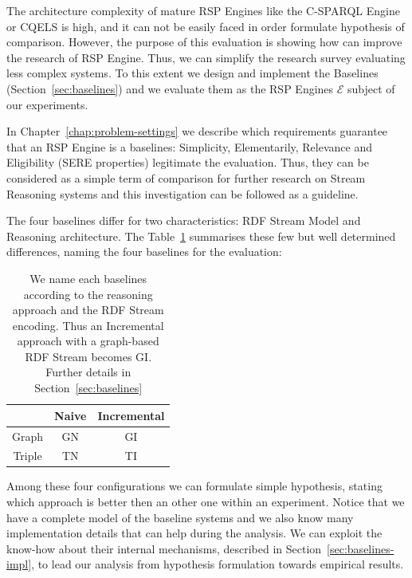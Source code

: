 The architecture complexity of mature RSP Engines like the C-SPARQL Engine or CQELS is high, and it can not be easily faced in order formulate hypothesis of comparison. However, the purpose of this evaluation is showing how \name can improve the research of RSP Engine. Thus, we can simplify the research survey evaluating less complex systems. To this extent we design and implement the Baselines (Section~\ref{sec:baselines}) and we evaluate them as the RSP Engines $\mathcal{E}$ subject of our experiments. 

In Chapter~\ref{chap:problem-settings} we describe which requirements guarantee that an RSP Engine is a baselines: Simplicity, Elementarily, Relevance and Eligibility (SERE properties) legitimate the evaluation. Thus, they can be considered as a simple term of comparison for further research on Stream Reasoning systems and this investigation can be followed as a guideline.
 
The four baselines differ for two characteristics: RDF Stream Model and Reasoning architecture. The Table~\ref{tab:baselines-names} summarises these few but well determined differences, naming the four baselines for the evaluation:
\begin{table}[htb]
\centering
\normalsize
\begin{tabular}{c|cc} %
	\hline
         & Naive & Incremental\\
	\hline
	Graph        &  GN      & GI\\
	Triple   &  TN   & TI\\
	\hline %
\end{tabular}
\caption[Baselines Naming Convention]{We name each baselines according to  the reasoning approach and the RDF Stream encoding. Thus an Incremental approach with a graph-based RDF Stream becomes GI. Further details in Section~\ref{sec:baselines}}
\label{tab:baselines-names}
\end{table}

\noindent Among these four configurations we can formulate simple hypothesis, stating which approach is better then an other one within an experiment. Notice that we have a complete model of the baseline systems and we also know many implementation details that can help during the analysis. We can exploit the know-how about their internal mechanisms, described in Section~\ref{sec:baselines-impl}, to lead our analysis from hypothesis formulation towards empirical results. 

